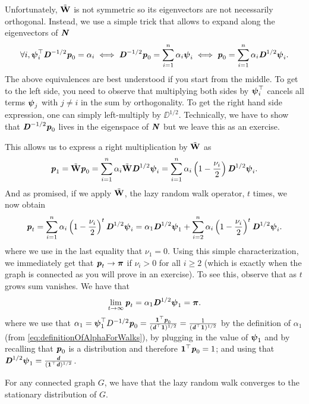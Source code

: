Unfortunately, ${\tilde{\mathbf{W}}}$ is not symmetric so its eigenvectors are not necessarily orthogonal. Instead, we use a simple trick that allows to expand along the eigenvectors of $\boldsymbol{\mathit{N}}$
\begin{align}\label{eq:definitionOfAlphaForWalks}
     \forall i, \boldsymbol{\mathit{\psi}}_i^{\top} \boldsymbol{\mathit{D}}^{-1/2} \boldsymbol{\mathit{p}}_0 = \alpha_i \iff \boldsymbol{\mathit{D}}^{-1/2} \boldsymbol{\mathit{p}}_0 = \sum_{i=1}^n \alpha_i \boldsymbol{\mathit{\psi}}_i \iff  \boldsymbol{\mathit{p}}_0 = \sum_{i=1}^n \alpha_i \boldsymbol{\mathit{D}}^{1/2} \boldsymbol{\mathit{\psi}}_i.
\end{align}
The above equivalences are best understood if you start from the middle. To get to the left side, you need to observe that multiplying both sides by $\boldsymbol{\mathit{\psi}}_i^{\top}$ cancels all terms $\boldsymbol{\mathit{\psi}}_j$ with $j \neq i$ in the sum by orthogonality. To get the right hand side expression, one can simply left-multiply by $\DD^{1/2}$. Technically, we have to show that $\boldsymbol{\mathit{D}}^{-1/2}\boldsymbol{\mathit{p}}_0$ lives in the eigenspace of $\boldsymbol{\mathit{N}}$ but we leave this as an exercise.

This allows us to express a right multiplication by ${\tilde{\mathbf{W}}}$ as
\[
    \boldsymbol{\mathit{p}}_1 = {\tilde{\mathbf{W}}} \boldsymbol{\mathit{p}}_0 = \sum_{i=1}^n \alpha_i {\tilde{\mathbf{W}}} \boldsymbol{\mathit{D}}^{1/2} \boldsymbol{\mathit{\psi}}_i = \sum_{i=1}^n \alpha_i \left(1-\frac{\nu_i}{2}\right) \boldsymbol{\mathit{D}}^{1/2} \boldsymbol{\mathit{\psi}}_i.
\]
And as promised, if we apply ${\tilde{\mathbf{W}}}$, the lazy random walk operator, $t$ times, we now obtain
\begin{align}\label{eq:distributionRandomWalkTSteps}
    \boldsymbol{\mathit{p}}_t = \sum_{i=1}^n \alpha_i \left(1-\frac{\nu_i}{2}\right)^t \boldsymbol{\mathit{D}}^{1/2} \boldsymbol{\mathit{\psi}}_i = \alpha_1 \boldsymbol{\mathit{D}}^{1/2} \boldsymbol{\mathit{\psi}}_1 + \sum_{i=2}^n \alpha_i \left(1-\frac{\nu_i}{2}\right)^t \boldsymbol{\mathit{D}}^{1/2} \boldsymbol{\mathit{\psi}}_i.
\end{align}
where we use in the last equality that $\nu_1 = 0$. Using this simple characterization, we immediately get that $\boldsymbol{\mathit{p}}_t \to \boldsymbol{\pi}$ if $\nu_i > 0$ for all $i \geq 2$ (which is exactly when the graph is connected as you will prove in an exercise). To see this, observe that as $t$ grows sum vanishes. We have that
\[
    \lim_{t \to \infty} \boldsymbol{\mathit{p}}_t = \alpha_1 \boldsymbol{\mathit{D}}^{1/2} \boldsymbol{\mathit{\psi}}_1 = \boldsymbol{\pi}.
\]
where we use that $\alpha_1 = \boldsymbol{\mathit{\psi}}_1^{\top} D^{-1/2} \boldsymbol{\mathit{p}}_0 = \frac{\boldsymbol{1}^{\top} \boldsymbol{\mathit{p}}_0 }{(\boldsymbol{\mathit{d}}^{\top} \boldsymbol{1})^{1/2}}= \frac{1}{(\boldsymbol{\mathit{d}}^{\top} \boldsymbol{1})^{1/2}}$ by the definition of $\alpha_1$ (from \ref{eq:definitionOfAlphaForWalks}), by plugging in the value of $\boldsymbol{\mathit{\psi}}_1$ and by recalling that $\boldsymbol{\mathit{p}}_0$ is a distribution and therefore $\boldsymbol{1}^{\top} \boldsymbol{\mathit{p}}_0 =1$; and using that $\boldsymbol{\mathit{D}}^{1/2} \boldsymbol{\mathit{\psi}}_1 = \frac{\boldsymbol{\mathit{d}} }{(\boldsymbol{1}^{\top} \boldsymbol{\mathit{d}})^{1/2}}$.

\begin{theorem}
For any connected graph $G$, we have that the lazy random walk converges to the stationary distribution of $G$.
\end{theorem}

